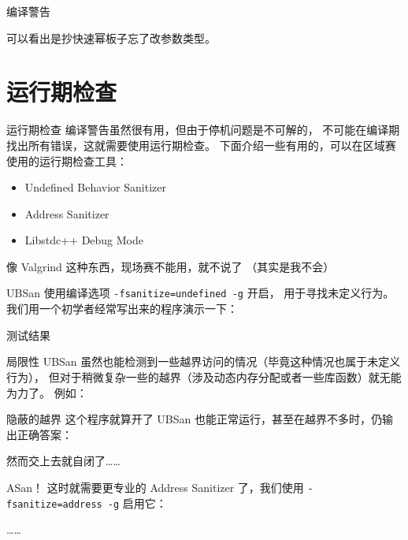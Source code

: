 \documentclass[10pt,mathserif]{beamer}%
\begin{document}
\begin{frame}{编译警告}
	
	可以看出是抄快速幂板子忘了改参数类型。
\end{frame}

\section{运行期检查}
\begin{frame}{运行期检查}
	编译警告虽然很有用，但由于停机问题是不可解的，
	不可能在编译期找出所有错误，这就需要使用运行期检查。
	下面介绍一些有用的，可以在区域赛使用的运行期检查工具：
	\begin{itemize}
		\item Undefined Behavior Sanitizer
		\item Address Sanitizer
		\item Libstdc++ Debug Mode
	\end{itemize}
	像 Valgrind 这种东西，现场赛不能用，就不说了
	\tiny （其实是我不会） \normalsize
\end{frame}

\begin{frame}{UBSan}
	使用编译选项 \lstinline!-fsanitize=undefined -g! 开启，
	用于寻找未定义行为。我们用一个初学者经常写出来的程序演示一下：
	
\end{frame}

\begin{frame}{测试结果}
	
\end{frame}

\begin{frame}{局限性}
	UBSan 虽然也能检测到一些越界访问的情况（毕竟这种情况也属于未定义行为），
	但对于稍微复杂一些的越界（涉及动态内存分配或者一些库函数）就无能为力了。
	例如：
	
\end{frame}

\begin{frame}{隐蔽的越界}
	这个程序就算开了 UBSan 也能正常运行，甚至在越界不多时，仍输出正确答案：
	
	然而交上去就自闭了……
\end{frame}

\begin{frame}{ASan！}
	这时就需要更专业的 Address Sanitizer 了，我们使用
	\lstinline|-fsanitize=address -g| 启用它：
	
	……
	
\end{frame}
\end{document}
